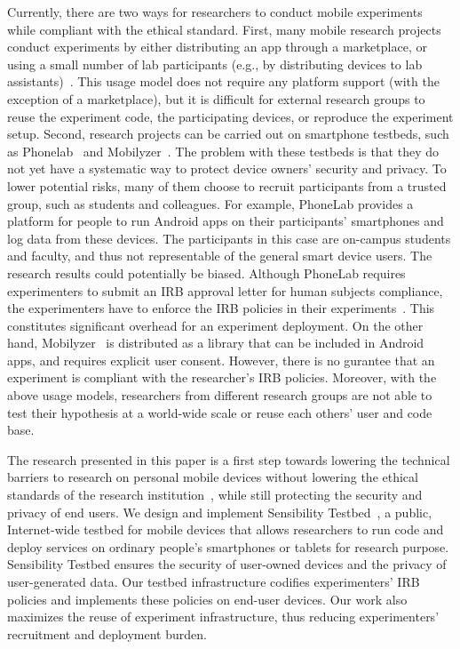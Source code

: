 Currently, there are two ways for researchers to conduct mobile 
experiments while compliant with the ethical standard. 
First, many mobile research projects conduct experiments 
by either distributing an app through a marketplace, or using a 
small number of lab participants (e.g., by distributing devices to 
lab assistants)~\cite{hao2013isleep, wang2012no, 
wang2013sensing}. This usage model does not require any 
platform support (with the exception of a marketplace), but it 
is difficult for external research groups to reuse the experiment 
code, the participating devices, or reproduce the experiment 
setup. Second, research projects can be carried out on 
smartphone testbeds, such as Phonelab~\cite{phonelab, 
nandugudi2013phonelab} and 
Mobilyzer~\cite{nikravesh2015mobilyzer}. 
The problem with these testbeds is that they do not yet 
have a systematic way to protect device owners' security and 
privacy. To lower potential risks, many of them choose to 
recruit participants from a trusted group, such as students and 
colleagues. For example, PhoneLab provides a platform for 
people to run Android apps on their participants' smartphones 
and log data from these devices. %
The participants in this case are on-campus students and faculty, 
and thus not representable of the general smart device users. 
The research results could potentially 
be biased. Although PhoneLab requires experimenters to 
submit an IRB approval letter for human subjects compliance, 
the experimenters have to enforce the IRB policies in their 
experiments~\cite{nandugudi2013phonelab}. This constitutes
significant overhead for an experiment deployment. On the other 
hand, Mobilyzer~\cite{nikravesh2015mobilyzer} is distributed 
as a library that can be included in Android apps, and requires 
explicit user consent. However, there is no gurantee that an 
experiment is compliant with the researcher's IRB policies.
Moreover, with the above usage models, researchers from 
different research groups are not able to test their hypothesis 
at a world-wide scale or reuse each others' user and code base.
					
The research presented in this paper is a first step towards lowering the technical
barriers to research on personal mobile devices without lowering the
ethical standards of the research institution~\cite{zevenbergen2013ethical}, while still 
protecting the security and privacy of end users. We design and implement 
Sensibility Testbed~\cite{sensibility, zhuang2014sensibility}, a 
public, Internet-wide testbed for mobile devices that
allows researchers to run code and deploy services on ordinary
people's smartphones or tablets for research purpose. Sensibility Testbed ensures
the security of user-owned devices and the privacy of
user-generated data. Our testbed 
infrastructure codifies experimenters' IRB policies and 
implements these policies on end-user devices. Our work also 
maximizes the reuse of experiment infrastructure, thus reducing 
experimenters' recruitment and deployment burden. 

